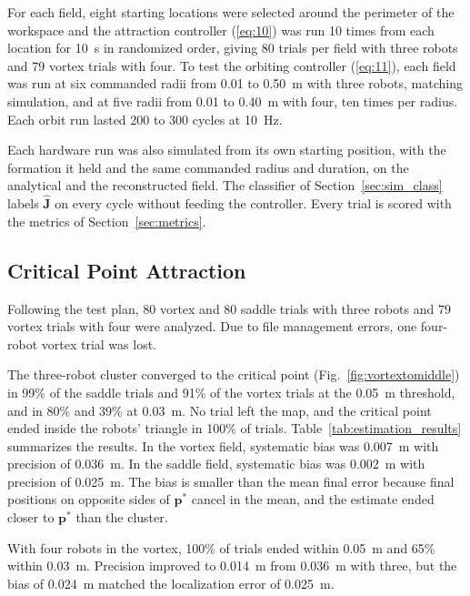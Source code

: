 \documentclass[lettersize,journal]{IEEEtran}
\newcommand{\rev}[1]{#1}
\begin{document}
For each field, eight starting locations were selected around the perimeter of the workspace and the attraction controller (\ref{eq:10}) was run 10 times from each location for \rev{10}~s in randomized order, giving 80 trials per field with three robots and \rev{79} vortex trials with four. To test the orbiting controller (\ref{eq:11}), each field was run at \rev{six} commanded radii from 0.01 to 0.50~m with three robots, matching simulation, and at five radii from 0.01 to 0.40~m with four, \rev{ten} times per radius. Each orbit run lasted \rev{200 to 300} cycles at 10~Hz.

Each hardware run was also simulated from its own starting position, with the formation it held and the same commanded radius and duration, on the analytical and the reconstructed field. The classifier of Section~\ref{sec:sim_class} labels $\hat{\mathbf{J}}$ on every cycle without feeding the controller. Every trial is scored with the metrics of Section~\ref{sec:metrics}.

 \subsection{Critical Point Attraction}

Following the test plan, \rev{80} vortex and \rev{80} saddle trials with three robots and \rev{79} vortex trials with four were analyzed. Due to file management errors, one four-robot vortex trial was lost.

The three-robot cluster converged to the critical point (Fig.~\ref{fig:vortextomiddle}) in \rev{99}\% of the saddle trials and \rev{91}\% of the vortex trials at the 0.05~m threshold, and in \rev{80}\% and \rev{39}\% at 0.03~m. No trial left the map, and the critical point ended inside the robots' triangle in \rev{100}\% of trials. Table~\ref{tab:estimation_results} summarizes the results. In the vortex field, systematic bias was \rev{0.007}~m with precision of \rev{0.036}~m. In the saddle field, systematic bias was \rev{0.002}~m with precision of \rev{0.025}~m. The bias is smaller than the mean final error because final positions on opposite sides of $\mathbf{p}^*$ cancel in the mean, and the estimate ended closer to $\mathbf{p}^*$ than the cluster.

With four robots in the vortex, \rev{100}\% of trials ended within 0.05~m and \rev{65}\% within 0.03~m. Precision improved to \rev{0.014}~m from \rev{0.036}~m with three, but the bias of \rev{0.024}~m matched the localization error of \rev{0.025}~m.
\end{document}
